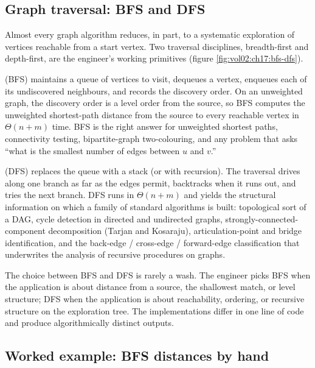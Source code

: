 

\subsection{Graph traversal: BFS and DFS}

Almost every graph algorithm reduces, in part, to a systematic
exploration of vertices reachable from a start vertex. Two
traversal disciplines, breadth-first and depth-first, are the
engineer's working primitives (figure
\ref{fig:vol02:ch17:bfs-dfs}).



 (BFS) maintains a queue of vertices
to visit, dequeues a vertex, enqueues each of its undiscovered
neighbours, and records the discovery order. On an unweighted
graph, the discovery order is a level order from the source, so
BFS computes the unweighted shortest-path distance from the source
to every reachable vertex in $\Theta(n + m)$ time. BFS is the
right answer for unweighted shortest paths, connectivity testing,
bipartite-graph two-colouring, and any problem that asks ``what is
the smallest number of edges between $u$ and $v$.''

 (DFS) replaces the queue with a stack
(or with recursion). The traversal drives along one branch as far
as the edges permit, backtracks when it runs out, and tries the
next branch. DFS runs in $\Theta(n + m)$ and yields the structural
information on which a family of standard algorithms is built:
topological sort of a DAG, cycle detection in directed and
undirected graphs, strongly-connected-component decomposition
(Tarjan and Kosaraju), articulation-point and bridge identification,
and the back-edge / cross-edge / forward-edge classification that
underwrites the analysis of recursive procedures on graphs.

The choice between BFS and DFS is rarely a wash. The engineer
picks BFS when the application is about distance from a source, the
shallowest match, or level structure; DFS when the application is
about reachability, ordering, or recursive structure on the
exploration tree. The implementations differ in one line of code
and produce algorithmically distinct outputs.

\subsection{Worked example: BFS distances by hand}

